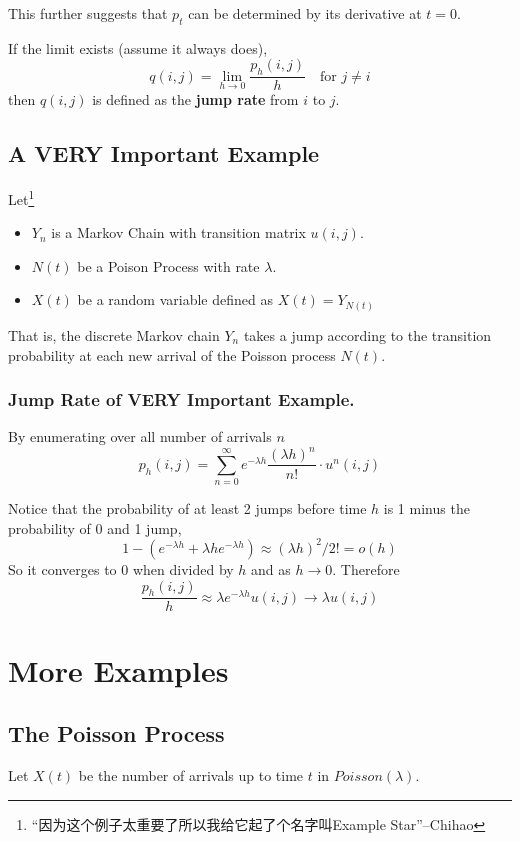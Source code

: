         This further suggests that $p_t$ can be determined by its derivative at $t=0$.
        \begin{definition}\label{def:JumpRate}
            If the limit exists (assume it always does),
            \[ q(i,j) = \lim_{h \to 0}\frac{p_h(i,j)}{h} \quad \text{for $j \neq i$} \]
            then $q(i,j)$ is defined as the \textbf{jump rate} from $i$ to $j$.
        \end{definition}

    \subsection{A VERY Important Example}\label{sub:CTMCCoreExample}
        Let\footnote{“因为这个例子太重要了所以我给它起了个名字叫Example Star”--Chihao}
        \begin{itemize}
            \item $Y_n$ is a Markov Chain with transition matrix $u(i,j)$.
            \item $N(t)$ be a Poison Process with rate $\lambda$.
            \item $X(t)$ be a random variable defined as $X(t)=Y_{N(t)}$
        \end{itemize}
        That is, the discrete Markov chain $Y_n$ takes a jump according to the transition probability at each new arrival of the Poisson process $N(t)$.

        \subsubsection{Jump Rate of VERY Important Example.}
        By enumerating over all number of arrivals $n$
        \[ p_h(i,j) = \sum_{n=0}^\infty e^{-\lambda h}\frac{(\lambda h)^n}{n!} \cdot u^n(i,j) \]

        Notice that the probability of at least 2 jumps before time $h$ is 1 minus the probability of 0 and 1 jump,
        \[ 1 - (e^{-\lambda h}+\lambda h e^{-\lambda h}) \approx (\lambda h)^2/2! = o(h) \]
        So it converges to 0 when divided by $h$ and as $h \to 0$.
        Therefore
        \[ \frac{p_h(i,j)}{h} \approx \lambda e^{-\lambda h}u(i,j) \to \lambda u(i,j) \]


\section{More Examples}
    \subsection{The Poisson Process}
        Let $X(t)$ be the number of arrivals up to time $t$ in $Poisson(\lambda)$.


